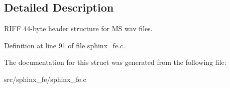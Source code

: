 \subsection{Detailed Description}
R\-I\-F\-F 44-\/byte header structure for M\-S wav files. 



Definition at line 91 of file sphinx\-\_\-fe.\-c.



The documentation for this struct was generated from the following file\-:\begin{DoxyCompactItemize}
\item 
src/sphinx\-\_\-fe/sphinx\-\_\-fe.\-c\end{DoxyCompactItemize}
